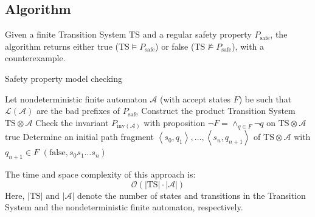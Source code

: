 \subsection{Algorithm}
Given a finite Transition System $\text{TS}$ and a regular safety property $P_{\text{safe}}$, the algorithm returns either true ($\text{TS}\models P_{\text{safe}}$) or false ($\text{TS}\not\models P_{\text{safe}}$), with a counterexample. 
\begin{algorithm}[H]
    \caption{Safety property model checking}
        \begin{algorithmic}[1]
            \State Let nondeterministic finite automaton $\mathcal{A}$ (with accept states $F$) be such that $\mathcal{L}(\mathcal{A})$ are the bad prefixes of $P_{\text{safe}}$ 
            \State Construct the product Transition System $\text{TS}\otimes\mathcal{A}$
            \State Check the invariant $P_{\text{inv}(\mathcal{A})}$ with proposition $\lnot F=\wedge_{q \in F}\lnot q$ on $\text{TS}\otimes\mathcal{A}$
                \State \Return $\text{true}$
            \Else 
                \State Determine an initial path fragment $\left\langle s_0,q_1\right\rangle,\dots,\left\langle s_n,q_{n+1}\right\rangle$ of $\text{TS}\otimes\mathcal{A}$ with $q_{n+1}\in F$
                \State \Return $(\text{false}, s_0s_1\dots s_n)$
            \EndIf
        \end{algorithmic}
\end{algorithm}
\noindent The time and space complexity of this approach is:
\[\mathcal{O}(\left\lvert\text{TS}\right\rvert\cdot\left\lvert\mathcal{A}\right\rvert)\]
Here, $\left\lvert\text{TS}\right\rvert$ and $\left\lvert\mathcal{A}\right\rvert$ denote the number of states and transitions in the Transition System and the nondeterministic finite automaton, respectively.
